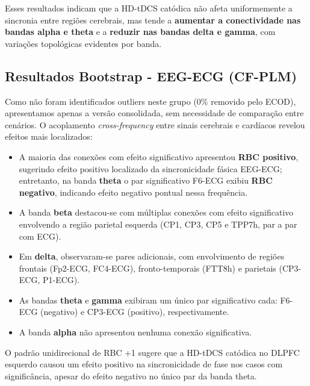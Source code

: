 Esses resultados indicam que a HD-tDCS catódica não afeta uniformemente a sincronia entre regiões cerebrais, mas tende a \textbf{aumentar a conectividade nas bandas alpha e theta} e a \textbf{reduzir nas bandas delta e gamma}, com variações topológicas evidentes por banda.

\subsection{Resultados Bootstrap - EEG-ECG (CF-PLM)}

Como não foram identificados outliers neste grupo (0\% removido pelo ECOD), apresentamos apenas a versão consolidada, sem necessidade de comparação entre cenários. O acoplamento \textit{cross-frequency} entre sinais cerebrais e cardíacos revelou efeitos mais localizados:
\begin{itemize}
  \item A maioria das conexões com efeito significativo apresentou \textbf{RBC positivo}, sugerindo efeito positivo localizado da sincronicidade fásica EEG-ECG; entretanto, na banda \textbf{theta} o par significativo F6-ECG exibiu \textbf{RBC negativo}, indicando efeito negativo pontual nessa frequência.
  \item A banda \textbf{beta} destacou-se com múltiplas conexões com efeito significativo envolvendo a região parietal esquerda (CP1, CP3, CP5 e TPP7h, par a par com ECG).
  \item Em \textbf{delta}, observaram-se pares adicionais, com envolvimento de regiões frontais (Fp2-ECG, FC4-ECG), fronto-temporais (FTT8h) e parietais (CP3-ECG, P1-ECG).
  \item As bandas \textbf{theta} e \textbf{gamma} exibiram um único par significativo cada: F6-ECG (negativo) e CP3-ECG (positivo), respectivamente.
  \item A banda \textbf{alpha} não apresentou nenhuma conexão significativa.
\end{itemize}

O padrão unidirecional de RBC +1 sugere que a HD-tDCS catódica no DLPFC esquerdo causou um efeito positivo na sincronicidade de fase nos casos com significância, apesar do efeito negativo no único par da banda theta.


